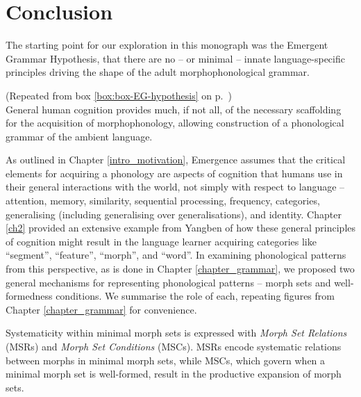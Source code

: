\chapter{Conclusion}\label{chapter_conclusion} \label{ch6}

The starting point for our exploration in this monograph was the Emergent Grammar Hypothesis, that there are no -- or minimal -- innate language-specific principles driving the shape of the adult morphophonological grammar.


\begin{example}  (Repeated  from box {\ref{box:box-EG-hypothesis}} on p.\ \pageref{box:box-EG-hypothesis})\\
General human cognition provides much, if not all, of the necessary scaffolding for the acquisition of morphophonology, allowing construction of a phonological grammar of the ambient language.
\end{example}

As outlined in Chapter \ref{intro_motivation}, Emergence assumes that the critical elements for acquiring a phonology are aspects of cognition that humans use in their general interactions with the world, not simply with respect to language -- attention, memory, similarity, sequential processing, frequency, categories, generalising (including generalising over generalisations), and identity. Chapter \ref{ch2} provided an extensive example from Yangben of how these general principles of cognition might result in the language learner acquiring categories like ``segment'', ``feature'', ``morph'', and ``word''. In examining phonological patterns from this perspective, as is done in Chapter \ref{chapter_grammar}, we  proposed two general mechanisms for representing phonological patterns -- morph sets and well-formedness conditions. We summarise the role of each, repeating figures from Chapter \ref{chapter_grammar} for convenience.

Systematicity within minimal morph sets is expressed with {\it Morph Set Relations} (MSRs) and {\it Morph Set Conditions} (MSCs). MSRs encode systematic relations between morphs in minimal morph sets, while MSCs, which govern when a minimal morph set is well-formed, result in the productive expansion of morph sets.


